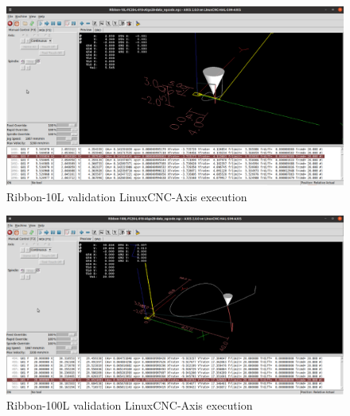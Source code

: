 \clearpage
\pagebreak
\begin{landscape}
	
	\begin{figure}
		\centering
		\caption  {Ribbon-10L validation LinuxCNC-Axis execution}
		\label{img-Ribbon-10L validation LinuxCNC-Axis execution}
		\includegraphics[width=1.65\textwidth]{Chap4/Validation/Ribbon-10L/Ribbon-10L-FC20-L-018-Algo28-CNC-Validation-Screenshot_2023-10-09_10-41-05.png} 
	\end{figure}	
	
\end{landscape}

\clearpage
\pagebreak
\begin{landscape}
	
	\begin{figure}
		\centering
		\caption  {Ribbon-100L validation LinuxCNC-Axis execution}
		\label{img-Ribbon-100L validation LinuxCNC-Axis execution}
		\includegraphics[width=1.65\textwidth]{Chap4/Validation/Ribbon-100L/Ribbon-100L-FC20-L-018-Algo28-CNC-Validation-Screenshot_2023-10-09_10-45-00.png} 
	\end{figure}	
	
\end{landscape}


